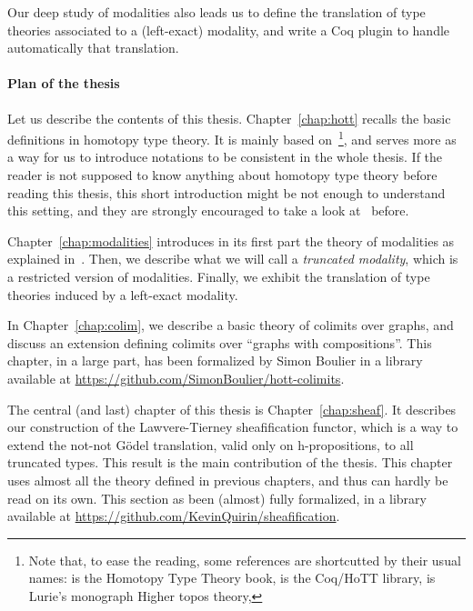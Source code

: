 Our deep study of modalities also leads us to
define the translation of type
theories associated to a (left-exact) modality, and write a Coq plugin
to handle automatically that translation.


\paragraph*{Plan of the thesis}

Let us describe the contents of this thesis. Chapter~\ref{chap:hott}
recalls the basic definitions in homotopy type theory. It is mainly
based on~\cite{hottbook}\footnote{Note that, to ease the reading, some
references are shortcutted by their usual names: \cite{hottbook} is
the Homotopy Type Theory book, \cite{hottlib} is the Coq/HoTT library,
\cite{lurie} is Lurie's monograph Higher topos theory, \etc}, and
serves more as a way for us to introduce notations to be consistent in
the whole thesis. If the reader is not supposed to know anything about
homotopy type theory before reading this thesis, this short
introduction might be not enough to understand this setting, and they are
strongly encouraged to take a look at~\cite{hottbook} before.

Chapter~\ref{chap:modalities} introduces in its first part the theory
of modalities as explained in~\cite{hottbook}. Then, we describe what
we will call a {\em truncated modality}, which is a restricted version
of modalities. Finally, we exhibit the translation of type theories
induced by a left-exact modality.

In Chapter~\ref{chap:colim}, we describe a basic theory of colimits
over graphs, and discuss an extension defining colimits over ``graphs
with compositions''. This chapter, in a large part, has been
formalized by Simon Boulier in a library available at
\url{https://github.com/SimonBoulier/hott-colimits}.

The central (and last) chapter of this thesis is
Chapter~\ref{chap:sheaf}. It describes our construction of the
Lawvere-Tierney sheafification functor, which is a way to extend the
not-not Gödel translation, valid only on h-propositions, to all
truncated types. This result is the main contribution of the thesis.
This chapter uses almost all the theory defined in previous chapters,
and thus can hardly be read on its own. This section as been (almost)
fully formalized, in a library available at
\url{https://github.com/KevinQuirin/sheafification}.


